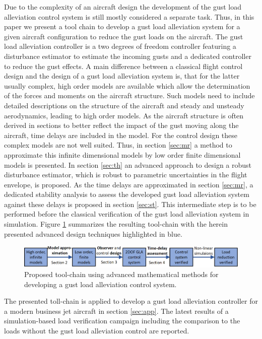 \documentclass[graybox]{svmult}
\begin{document}
Due to the complexity of an aircraft design the development of the gust load alleviation control system is still mostly considered a separate task. Thus, in this paper we present a tool chain to develop a gust load alleviation system for a given aircraft configuration to reduce the gust loads on the aircraft. The gust load alleviation controller is a two degrees of freedom controller featuring a disturbance estimator to estimate the incoming gusts and a dedicated controller to reduce the gust effects. A main difference between a classical flight  control design and the design of a gust load alleviation system is, that for the latter usually complex, high order models are available which allow the determination of the forces and moments on the  aircraft structure. Such models need to include detailed descriptions on the structure of the aircraft and steady and unsteady aerodynamics, leading to high order models. As the aircraft structure is often derived in sections to better reflect the impact of the gust moving along the aircraft, time delays are included in the model. For the control design these complex models are not well suited. Thus, in section \ref{sec:mr} a method to approximate  this infinite dimensional models by low order finite dimensional models is presented. In section \ref{sec:th} an advanced approach to design a robust disturbance estimator, which is robust to parametric uncertainties in the flight envelope, is proposed.
As the time delays are approximated in section \ref{sec:mr}, a dedicated stability analysis to assess the developed gust load alleviation system against these delays is proposed in section \ref{sec:st}. This intermediate step is to be performed before the classical verification of the gust load alleviation system in simulation. Figure \ref{fig:toolchain} summarizes the resulting tool-chain  with the  herein presented advanced design techniques highlighted in blue. 

\begin{figure}[bth]
	\centering
		\includegraphics[width=1\textwidth]{strct.png}
	\caption{Proposed tool-chain using advanced mathematical methods for developing a gust load alleviation control system.}
	\label{fig:toolchain}	
\end{figure}

The presented toll-chain is applied to develop a gust load alleviation controller for a modern business jet aircraft in section \ref{sec:app}. The latest  results of a simulation-based load verification campaign including the comparison to  the loads  without  the gust load alleviation control are reported.
\end{document}
